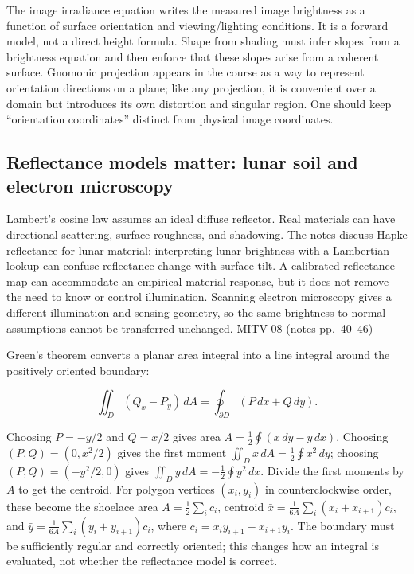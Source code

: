 The image irradiance equation writes the measured image brightness as a function of surface orientation and viewing/lighting conditions. It is a forward model, not a direct height formula. Shape from shading must infer slopes from a brightness equation and then enforce that these slopes arise from a coherent surface. Gnomonic projection appears in the course as a way to represent orientation directions on a plane; like any projection, it is convenient over a domain but introduces its own distortion and singular region. One should keep ``orientation coordinates'' distinct from physical image coordinates.

\subsection{Reflectance models matter: lunar soil and electron microscopy}\label{04-visual-computing-ii-ch032-reflectance-models-matter-lunar-soil-and-electron-microscopy}

Lambert's cosine law assumes an ideal diffuse reflector. Real materials can have directional scattering, surface roughness, and shadowing. The notes discuss Hapke reflectance for lunar material: interpreting lunar brightness with a Lambertian lookup can confuse reflectance change with surface tilt. A calibrated reflectance map can accommodate an empirical material response, but it does not remove the need to know or control illumination. Scanning electron microscopy gives a different illumination and sensing geometry, so the same brightness-to-normal assumptions cannot be transferred unchanged. \hyperref[04-visual-computing-ii-ch036-mitv-08---shading-special-cases-lunar-surface-scanning-electron-microscope-greens-theorem]{MITV-08} (notes pp.~40--46)

Green's theorem converts a planar area integral into a line integral around the positively oriented boundary:

\[
\iint_D (Q_x-P_y)\,dA=\oint_{\partial D}(P\,dx+Q\,dy).
\]

Choosing \(P=-y/2\) and \(Q=x/2\) gives area \(A=\tfrac12\oint(x\,dy-y\,dx)\). Choosing \((P,Q)=(0,x^2/2)\) gives the first moment \(\iint_Dx\,dA=\tfrac12\oint x^2\,dy\); choosing \((P,Q)=(-y^2/2,0)\) gives \(\iint_Dy\,dA=-\tfrac12\oint y^2\,dx\). Divide the first moments by \(A\) to get the centroid. For polygon vertices \((x_i,y_i)\) in counterclockwise order, these become the shoelace area \(A=\tfrac12\sum_i c_i\), centroid \(\bar x=\frac{1}{6A}\sum_i(x_i+x_{i+1})c_i\), and \(\bar y=\frac{1}{6A}\sum_i(y_i+y_{i+1})c_i\), where \(c_i=x_i y_{i+1}-x_{i+1}y_i\). The boundary must be sufficiently regular and correctly oriented; this changes how an integral is evaluated, not whether the reflectance model is correct.

